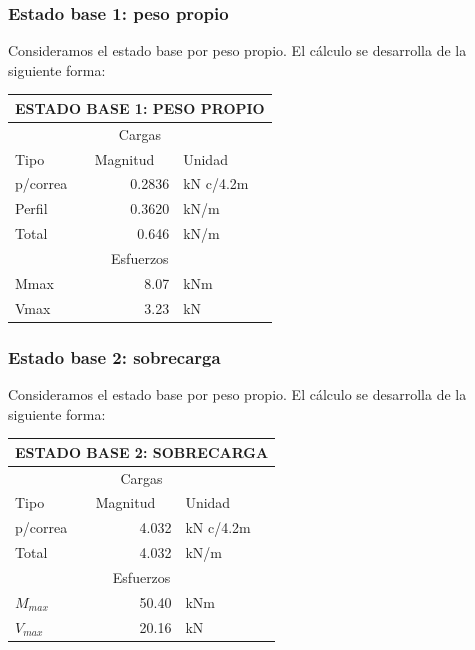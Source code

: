 \documentclass[../main.tex]{subfiles}
\begin{document}
\subsubsection{Estado base 1: peso propio}

Consideramos el estado base por peso propio. El cálculo se desarrolla de la
siguiente forma:


\begin{table}[ht]
  \centering
    \begin{tabular}{|l|r|l|}
    \hline
    \multicolumn{3}{|c|}{\textbf{ESTADO BASE 1: PESO PROPIO}} \bigstrut\\
    \hline
    \multicolumn{3}{|c|}{Cargas} \bigstrut\\
    \hline
    Tipo  & \multicolumn{1}{l|}{Magnitud} & Unidad \bigstrut\\
    \hline
    p/correa & 0.2836 & kN c/4.2m \bigstrut\\
    \hline
    Perfil & 0.3620 & kN/m \bigstrut\\
    \hline
    Total & 0.646 & kN/m \bigstrut\\
    \hline
    \multicolumn{3}{|c|}{Esfuerzos} \bigstrut\\
    \hline
    Mmax  & 8.07  & kNm \bigstrut\\
    \hline
    Vmax  & 3.23  & kN \bigstrut\\
    \hline
    \end{tabular}%
  \label{tab:addlabel}%
\end{table}%

\subsubsection{Estado base 2: sobrecarga}

Consideramos el estado base por peso propio. El cálculo se desarrolla de la
siguiente forma:

\begin{table}[ht]
  \centering
    \begin{tabular}{|l|r|l|}
    \hline
    \multicolumn{3}{|c|}{\textbf{ESTADO BASE 2: SOBRECARGA}} \bigstrut\\
    \hline
    \multicolumn{3}{|c|}{Cargas} \bigstrut\\
    \hline
    Tipo  & \multicolumn{1}{l|}{Magnitud} & Unidad \bigstrut\\
    \hline
    p/correa & 4.032 & kN c/4.2m \bigstrut\\
    \hline
    Total & 4.032 & kN/m \bigstrut\\
    \hline
    \multicolumn{3}{|c|}{Esfuerzos} \bigstrut\\
    \hline
    $M_{max}$  & 50.40 & kNm \bigstrut\\
    \hline
    $V_{max}$  & 20.16 & kN \bigstrut\\
    \hline
    \end{tabular}%
\end{table}%
\end{document}

